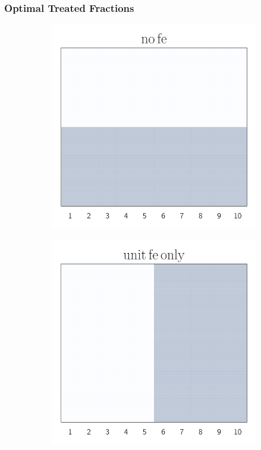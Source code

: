 	
 \subsubsection{Optimal Treated Fractions}\label{subsec:treated-fraction} \texttt{}
 \begin{figure}[t!]
	\centering
	\begin{subfigure}{0.2\textwidth}
		\centering
		\includegraphics[width=1\linewidth]{plots/illustration/no-fe.pdf}
	\end{subfigure}%
	\begin{subfigure}{0.2\textwidth}
		\centering
		\includegraphics[width=1\linewidth]{plots/illustration/unit-fe.pdf}

\end{subfigure}
\end{figure}
